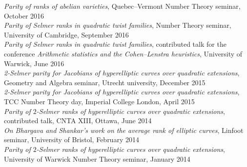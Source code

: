 \documentclass{res}
\begin{document}
\begin{resume}
{\it Parity of ranks of abelian varieties}, Quebec--Vermont Number Theory seminar, October 2016  \medskip \\
{\it Parity of Selmer ranks in quadratic twist families}, Number Theory seminar, University of Cambridge, September 2016  \medskip \\
{\it Parity of Selmer ranks in quadratic twist families}, contributed talk for the conference  {\it Arithmetic statistics and the Cohen--Lenstra heuristics}, University of Warwick, June 2016  \medskip \\
{\it 2-Selmer parity for Jacobians of hyperelliptic curves over quadratic extensions}, Geometry and Algebra seminar, Utrecht university, December 2015  \medskip \\
{\it 2-Selmer parity for Jacobians of hyperelliptic curves over quadratic extensions}, TCC Number Theory day, Imperial College London, April 2015  \medskip \\
 {\it Parity of $2$-Selmer ranks of hyperelliptic curves over quadratic extensions}, contributed talk, CNTA XIII, Ottawa, June 2014  \medskip \\
 {\it On Bhargava and Shankar's work on the average rank of elliptic curves}, Linfoot seminar, University of Bristol, February 2014  \medskip \\
 {\it Parity of $2$-Selmer ranks of hyperelliptic curves over quadratic extensions}, University of Warwick Number Theory seminar, January 2014  \medskip \\
       

\end{resume}
\end{document}
